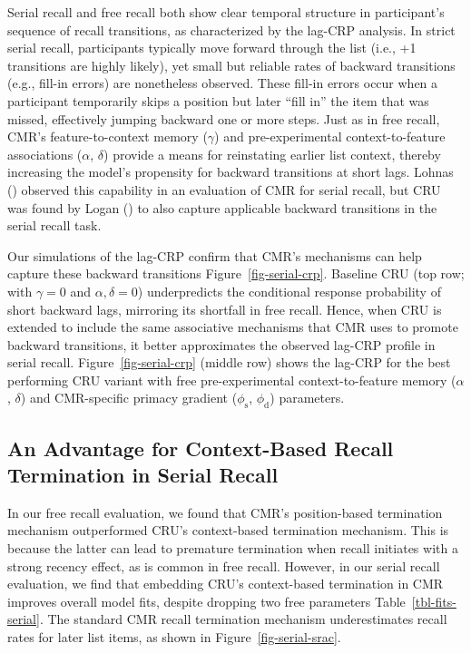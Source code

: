 \documentclass[
  man,
  floatsintext,
  longtable,
  nolmodern,
  notxfonts,
  notimes,
  draftfirst,
  colorlinks=true,linkcolor=blue,citecolor=blue,urlcolor=blue]{apa7}
\begin{document}
Serial recall and free recall both show clear temporal structure in
participant's sequence of recall transitions, as characterized by the
lag-CRP analysis. In strict serial recall, participants typically move
forward through the list (i.e., +1 transitions are highly likely), yet
small but reliable rates of backward transitions (e.g., fill-in errors)
are nonetheless observed. These fill-in errors occur when a participant
temporarily skips a position but later ``fill in'' the item that was
missed, effectively jumping backward one or more steps. Just as in free
recall, CMR's feature-to-context memory (\(\gamma\)) and
pre-experimental context-to-feature associations (\(\alpha\),
\(\delta\)) provide a means for reinstating earlier list context,
thereby increasing the model's propensity for backward transitions at
short lags. Lohnas () observed
this capability in an evaluation of CMR for serial recall, but CRU was
found by Logan () to also capture
applicable backward transitions in the serial recall task.

Our simulations of the lag-CRP confirm that CMR's mechanisms can help
capture these backward transitions Figure~\ref{fig-serial-crp}. Baseline
CRU (top row; with \(\gamma=0\) and \(\alpha, \delta=0\)) underpredicts
the conditional response probability of short backward lags, mirroring
its shortfall in free recall. Hence, when CRU is extended to include the
same associative mechanisms that CMR uses to promote backward
transitions, it better approximates the observed lag-CRP profile in
serial recall. Figure~\ref{fig-serial-crp} (middle row) shows the
lag-CRP for the best performing CRU variant with free pre-experimental
context-to-feature memory (\(\alpha\), \(\delta\)) and CMR-specific
primacy gradient (\(\phi_\text{s}\), \(\phi_\text{d}\)) parameters.

\subsection{An Advantage for Context-Based Recall Termination in Serial
Recall}\label{an-advantage-for-context-based-recall-termination-in-serial-recall}

In our free recall evaluation, we found that CMR's position-based
termination mechanism outperformed CRU's context-based termination
mechanism. This is because the latter can lead to premature termination
when recall initiates with a strong recency effect, as is common in free
recall. However, in our serial recall evaluation, we find that embedding
CRU's context-based termination in CMR improves overall model fits,
despite dropping two free parameters Table~\ref{tbl-fits-serial}. The
standard CMR recall termination mechanism underestimates recall rates
for later list items, as shown in Figure~\ref{fig-serial-srac}.
\end{document}
